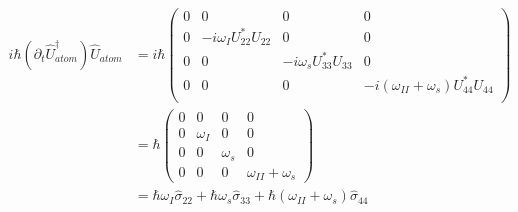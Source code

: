 \documentclass[aps,pra,showpacs,amsmath,amssymb,nofootinbib,longbibliography,superscriptaddress
]{revtex4-1}
\theoremstyle{definition}
\theoremstyle{remark}
\newcommand{\0}{\hat{0}}
\begin{document}
\begin{align}
    i \hbar (\partial_t \hat{U}_{atom}^{\dagger}) \hat{U}_{atom} &= i \hbar \left(\begin{array}{cccc}
        0 & 0 & 0 & 0\\
        0 & -i \omega_I U_{22}^{*} U_{22} & 0 & 0\\
        0 & 0 & -i \omega_s U_{33}^{*} U_{33} & 0\\
        0 & 0 & 0 & -i(\omega_{II} + \omega_s)U_{44}^{*} U_{44}\\
    \end{array}\right) \nonumber\\
    &= \hbar \left(\begin{array}{cccc}
        0 & 0 & 0 & 0\\
        0 & \omega_I & 0 & 0\\
        0 & 0 & \omega_s & 0\\
        0 & 0 & 0 & \omega_{II} + \omega_s
    \end{array}\right)\nonumber\\
    &= \hbar \omega_I \hat{\sigma}_{22} + \hbar \omega_s \hat{\sigma}_{33} + \hbar (\omega_{II} + \omega_s) \hat{\sigma}_{44}
\end{align}
\end{document}
